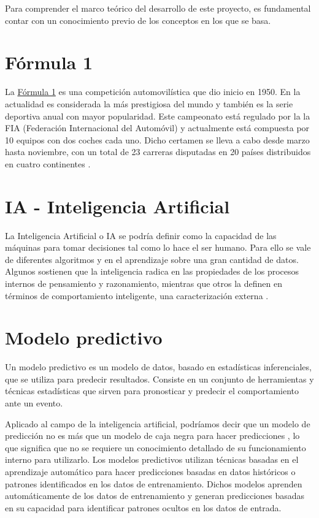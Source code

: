 
Para comprender el marco teórico del desarrollo de este proyecto, es fundamental contar con un conocimiento previo de los conceptos en los que se basa.

\section{Fórmula 1} 

La \href{https://www.formula1.com/}{Fórmula 1} es una competición automovilística que dio inicio en 1950. En la actualidad es considerada la más prestigiosa del mundo y también es la serie deportiva anual con mayor popularidad. Este campeonato está regulado por la la FIA (Federación Internacional del Automóvil) y actualmente está compuesta por 10 equipos con dos coches cada uno. Dicho certamen se lleva a cabo desde marzo hasta noviembre, con un total de 23 carreras disputadas en 20 países distribuidos en cuatro continentes \cite{f1:f1}.

\section{IA - Inteligencia Artificial}

La Inteligencia Artificial o IA se podría definir como la capacidad de las máquinas para tomar decisiones tal como lo hace el ser humano. Para ello se vale de diferentes algoritmos y en el aprendizaje sobre una gran cantidad de datos. Algunos sostienen que la inteligencia radica en las propiedades de los procesos internos de pensamiento y razonamiento, mientras que otros la definen en términos de comportamiento inteligente, una caracterización externa \cite{aimodaproach}.

\section{Modelo predictivo}

Un modelo predictivo es un modelo de datos, basado en estadísticas inferenciales, que se utiliza para predecir resultados. Consiste en un conjunto de herramientas y técnicas estadísticas que sirven para pronosticar y predecir el comportamiento ante un evento. 

Aplicado al campo de la inteligencia artificial, podríamos decir que un modelo de predicción no es más que un modelo de caja negra para hacer predicciones \cite{art:predictmodel}, lo que significa que no se requiere un conocimiento detallado de su funcionamiento interno para utilizarlo. Los modelos predictivos utilizan técnicas basadas en el aprendizaje automático para hacer predicciones basadas en datos históricos o patrones identificados en los datos de entrenamiento. Dichos modelos aprenden automáticamente de los datos de entrenamiento y generan predicciones basadas en su capacidad para identificar patrones ocultos en los datos de entrada.

